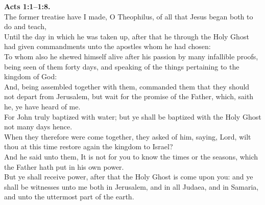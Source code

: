 \documentclass[10pt]{article} %
\begin{document}
{\begin{minipage}[t]{0.45\textwidth}
\textbf{Acts 1:1--1:8.}\\
The former treatise have I made, O Theophilus, of all that Jesus began both to do and teach,\\
Until the day in which he was taken up, after that he through the Holy Ghost had given commandments unto the apostles whom he had chosen:\\
To whom also he shewed himself alive after his passion by many infallible proofs, being seen of them forty days, and speaking of the things pertaining to the kingdom of God:\\
And, being assembled together with them, commanded them that they should not depart from Jerusalem, but wait for the promise of the Father, which, saith he, ye have heard of me.\\
For John truly baptized with water; but ye shall be baptized with the Holy Ghost not many days hence.\\
When they therefore were come together, they asked of him, saying, Lord, wilt thou at this time restore again the kingdom to Israel?\\
And he said unto them, It is not for you to know the times or the seasons, which the Father hath put in his own power.\\
But ye shall receive power, after that the Holy Ghost is come upon you: and ye shall be witnesses unto me both in Jerusalem, and in all Judaea, and in Samaria, and unto the uttermost part of the earth.\\

\end{minipage}}
\vspace*{\fill}
\newpage
\Huge%
\vspace*{\fill}
\begin{spacing}{1.5}%
\end{spacing}
\vspace*{\fill}
\end{document}
